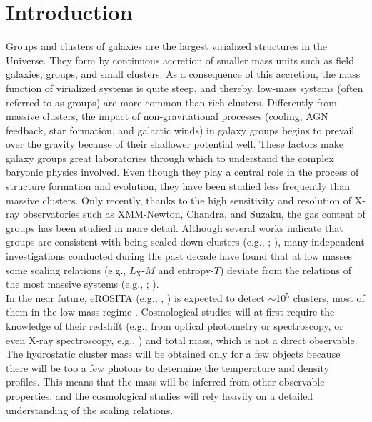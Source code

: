 \documentclass{aa} %
\begin{document}
%

\section{Introduction}
Groups and clusters of galaxies are the largest virialized structures
in the Universe. They form by continuous accretion of smaller mass
units such as field galaxies, groups, and small clusters. As a consequence
of this accretion, the mass function of virialized systems is quite
steep, and thereby, low-mass systems (often referred to as groups) are
more common than rich clusters.  Differently from massive clusters,
the impact of non-gravitational processes (cooling, AGN feedback, star
formation, and galactic winds) in galaxy groups begins to prevail over
the gravity because of their shallower potential well. These factors make
galaxy groups great laboratories through which to understand the complex baryonic
physics involved. Even though they play a central role in the process
of structure formation and evolution, they have been studied less frequently than massive clusters. Only recently, thanks to the high
sensitivity and resolution of X-ray observatories such as XMM-Newton,
Chandra, and Suzaku, the gas content of groups has been studied in more detail. Although several works indicate that groups are
consistent with being scaled-down clusters
(e.g.,  \citealt{2004MNRAS.350.1511O}; \citealt{2009ApJ...693.1142S}), many independent investigations conducted during the past decade have found that
 at low masses some scaling relations (e.g., $L_{\text{X}}$-$M$
and entropy-$T$) deviate from the relations of the most massive systems
(e.g., \citealt{2009ApJ...693.1142S};
\citealt{2011A&A...535A.105E}).\\
In the near future, eROSITA (e.g., \citealt{2010AIPC.1248..543P}, \citealt{2012arXiv1209.3114M}) is expected to detect $\sim$10$^5$ clusters, most of them in the low-mass regime \citep{2012MNRAS.422...44P}. Cosmological studies will at first require the knowledge of their redshift (e.g., from optical photometry or spectroscopy, or even X-ray spectroscopy, e.g., \citealt{2014A&A...567A..65B}) and total mass, which is not a direct observable. The hydrostatic cluster mass will be obtained only for a few objects because there will be too a few photons to determine the temperature and density profiles. This means that the mass will be inferred from other observable properties, and the cosmological studies will rely heavily on a detailed understanding of the scaling relations.\\
\end{document}
